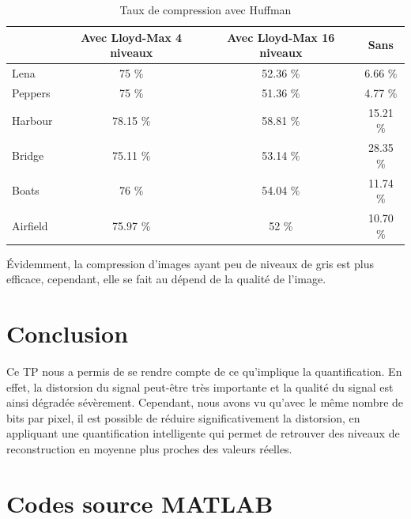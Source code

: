 \documentclass[a4paper, 12pt]{article}
\begin{document}
\begin{table}[!h]
	\centering
		\begin{tabular}{l|c | c| c|}
			\cline{2-4}
			                               & Avec Lloyd-Max 4 niveaux & Avec Lloyd-Max 16 niveaux & Sans      \\
			\hline
			\multicolumn{1}{|l|}{Lena}     & 75 \%                    & 52.36 \%                  & 6.66 \%   \\
			\hline
			\multicolumn{1}{|l|}{Peppers}  & 75 \%                    & 51.36 \%                  & 4.77 \%   \\
			\hline
			\multicolumn{1}{|l|}{Harbour}  & 78.15 \%                 & 58.81 \%                  & 15.21 \%  \\
			\hline
			\multicolumn{1}{|l|}{Bridge}   & 75.11 \%                 & 53.14 \%                  & 28.35 \%  \\
			\hline
			\multicolumn{1}{|l|}{Boats}    & 76 \%                    & 54.04 \%                  & 11.74 \%  \\
			\hline
			\multicolumn{1}{|l|}{Airfield} & 75.97 \%                 & 52 \%                     & 10.70 \%  \\
			\hline
		\end{tabular}
	\caption{Taux de compression avec Huffman}
	\label{tab:TableComparaisonTauxCompression}
\end{table}

Évidemment, la compression d'images ayant peu de niveaux de gris est plus efficace, cependant, elle se fait au dépend de la qualité de l'image. 

\newpage

\section{Conclusion}

Ce TP nous a permis de se rendre compte de ce qu'implique la quantification. En effet, la distorsion du signal peut-être très importante et la qualité du signal est ainsi dégradée sévèrement. Cependant, nous avons vu qu'avec le même nombre de bits par pixel, il est possible de réduire significativement la distorsion, en appliquant une quantification intelligente qui permet de retrouver des niveaux de reconstruction en moyenne plus proches des valeurs réelles.

\clearpage
\appendix

\section{Codes source MATLAB}
\end{document}
